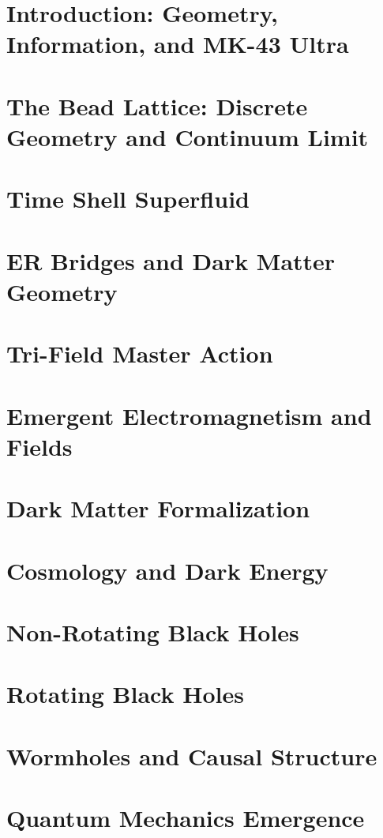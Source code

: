 \documentclass[11pt,oneside]{book}
\theoremstyle{definition}
\begin{document}
\mainmatter

\chapter{Introduction: Geometry, Information, and MK-43 Ultra}

\chapter{The Bead Lattice: Discrete Geometry and Continuum Limit}
\chapter{Time Shell Superfluid}
\chapter{ER Bridges and Dark Matter Geometry}
\chapter{Tri-Field Master Action}
\chapter{Emergent Electromagnetism and Fields}
\chapter{Dark Matter Formalization}
\chapter{Cosmology and Dark Energy}
\chapter{Non-Rotating Black Holes}
\chapter{Rotating Black Holes}
\chapter{Wormholes and Causal Structure}
\chapter{Quantum Mechanics Emergence}
\end{document}
